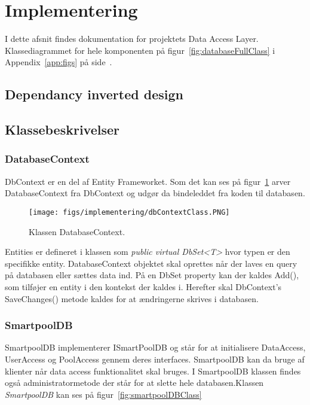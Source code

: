 \section{Implementering}
I dette afsnit findes dokumentation for projektets Data Access Layer. Klassediagrammet for hele komponenten på figur~\ref{fig:databaseFullClass} i Appendix~\ref{app:figs} på side~\pageref{fig:databaseFullClass}.

\subsection{Dependancy inverted design}
 
\subsection{Klassebeskrivelser}

\subsubsection{DatabaseContext}
DbContext er en del af Entity Frameworket. Som det kan ses på figur~\ref{fig:dbContextClass} arver DatabaseContext fra DbContext \cite{microsoftdbcontext} og udgør da bindeleddet fra koden til databasen.

\begin{figure}
\centering
\texttt{[image: figs/implementering/dbContextClass.PNG]}
\caption{Klassen DatabaseContext.}
\label{fig:dbContextClass}
\end{figure}

Entities er defineret i klassen som \textit{public virtual DbSet<T>} hvor typen er den specifikke entity.
DatabaseContext objektet skal oprettes når der laves en query på databasen eller sættes data ind.
På en DbSet property kan der kaldes Add(), som tilføjer en entity i den kontekst der kaldes i. Herefter skal DbContext’s SaveChanges() metode kaldes for at ændringerne skrives i databasen.

\subsubsection{SmartpoolDB}
SmartpoolDB implementerer ISmartPoolDB og står for at initialisere DataAccess, UserAccess og PoolAccess gennem deres interfaces. SmartpoolDB kan da bruge af klienter når data access funktionalitet skal bruges. I SmartpoolDB klassen findes også administratormetode der står for at slette hele databasen.Klassen \textit{SmartpoolDB} kan ses på figur~\ref{fig:smartpoolDBClass}

